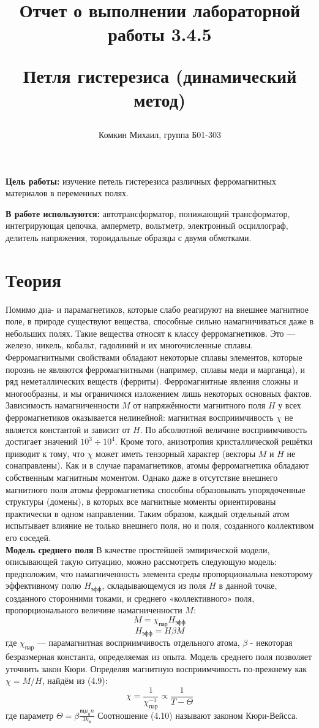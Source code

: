 \documentclass[12pt,a4paper]{article}
\title{
Отчет о выполнении лабораторной работы 3.4.5

Петля гистерезиса (динамический метод)
}
\author{Комкин Михаил, группа Б01-303}
\begin{document}
\maketitle

\textbf{Цель работы:} изучение петель гистерезиса различных ферромагнитных
материалов в переменных полях.

\textbf{В работе используются:} автотрансформатор, понижающий трансформатор, интегрирующая цепочка, амперметр, вольтметр, электронный
осциллограф, делитель напряжения, тороидальные образцы с двумя обмотками.

\section{Теория}
Помимо диа- и парамагнетиков, которые слабо реагируют на внешнее
магнитное поле, в природе существуют вещества, способные сильно намагничиваться даже в небольших полях. Такие вещества относят к классу ферромагнетиков. Это — железо, никель, кобальт, гадолиний
и их многочисленные сплавы. Ферромагнитными свойствами обладают
некоторые сплавы элементов, которые порознь не являются ферромагнитными (например, сплавы меди и марганца), и ряд неметаллических
веществ (ферриты). Ферромагнитные явления сложны и многообразны,
и мы ограничимся изложением лишь некоторых основных фактов.
Зависимость намагниченности $M$ от напряжённости магнитного поля $H$ у всех ферромагнетиков оказывается нелинейной: магнитная восприимчивость $\chi$ не является константой и зависит от $H$. По абсолютной
величине восприимчивость достигает значений $10^3 ÷ 10^4$.
Кроме того, анизотропия кристаллической решётки приводит к тому, что $\chi$ может иметь
тензорный характер (векторы $M$ и $H$ не сонаправлены).
Как и в случае парамагнетиков, атомы ферромагнетика обладают
собственным магнитным моментом. Однако даже в отсутствие внешнего магнитного поля атомы ферромагнетика способны образовывать упорядоченные структуры (домены), в которых все магнитные моменты
ориентированы практически в одном направлении. Таким образом, каждый отдельный атом испытывает влияние не только внешнего поля, но
и поля, созданного коллективом его соседей. \\

\textbf{Модель среднего поля}
В качестве простейшей эмпирической модели, описывающей такую ситуацию, можно рассмотреть следующую
модель: предположим, что намагниченность элемента среды пропорциональна некоторому эффективному полю $H_\text{эфф}$, складывающемуся из
поля $H$ в данной точке, созданного сторонними токами, и среднего «коллективного» поля, пропорционального величине намагниченности $M$:
\[
    M = \chi_\text{пар} H_\text{эфф}
\]
\[
    H_\text{эфф} = H \beta M
\]
где $\chi_\text{пар}$ — парамагнитная восприимчивость отдельного атома, $\beta$ - некоторая безразмерная константа, определяемая из опыта.
Модель среднего поля позволяет уточнить закон Кюри. Определяя
магнитную восприимчивость по-прежнему как $\chi = M/H$, найдём из
(4.9):
\[
\chi = \frac{1}{\chi^{-1}_\text{пар}} \propto \frac{1}{T - \Theta}
\]
где параметр $\Theta = \beta \frac{\mathfrak{m} \mu_0 n}{3k_\text{Б}}$
Соотношение (4.10) называют законом Кюри-Вейсса.
\end{document}

